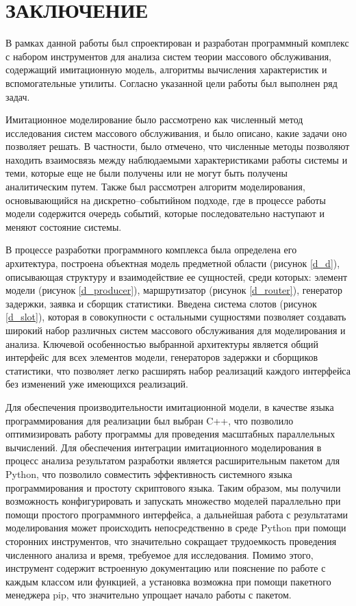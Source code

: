 \section*{\centering\normalsize ЗАКЛЮЧЕНИЕ}

В рамках данной работы был спроектирован и разработан программный комплекс с набором инструментов для анализа систем теории массового обслуживания, содержащий имитационную модель, алгоритмы вычисления характеристик и вспомогательные утилиты. Согласно указанной цели работы был выполнен ряд задач.

Имитационное моделирование было рассмотрено как численный метод исследования систем массового обслуживания, и было описано, какие задачи оно позволяет решать. В частности, было отмечено, что численные методы позволяют находить взаимосвязь между наблюдаемыми характеристиками работы системы и теми, которые еще не были получены или не могут быть получены аналитическим путем. Также был рассмотрен алгоритм моделирования, основывающийся на дискретно--событийном подходе, где в процессе работы модели содержится очередь событий, которые последовательно наступают и меняют состояние системы. 

В процессе разработки программного комплекса была определена его архитектура, построена объектная модель предметной области (рисунок  \ref{d_d}), описывающая структуру и взаимодействие ее сущностей, среди которых: элемент модели (рисунок \ref{d_producer}), маршрутизатор (рисунок \ref{d_router}), генератор задержки, заявка и сборщик статистики. Введена система слотов (рисунок \ref{d_slot}), которая в совокупности с остальными сущностями позволяет создавать широкий набор различных систем массового обслуживания для моделирования и анализа. Ключевой особенностью выбранной архитектуры является общий интерфейс для всех элементов модели, генераторов задержки и сборщиков статистики, что позволяет легко расширять набор реализаций каждого интерфейса без изменений уже имеющихся реализаций.

Для обеспечения производительности имитационной модели, в качестве языка программирования для реализации был выбран C++, что позволило оптимизировать работу программы для проведения масштабных параллельных вычислений. Для обеспечения интеграции имитационного моделирования в процесс анализа результатом разработки является расширительным пакетом для Python, что позволило совместить эффективность системного языка программирования и простоту скриптового языка. Таким образом, мы получили возможность конфигурировать и запускать множество моделей параллельно при помощи простого программного интерфейса, а дальнейшая работа с результатами моделирования может происходить непосредственно в среде Python при помощи сторонних инструментов, что значительно сокращает трудоемкость проведения численного анализа и время, требуемое для исследования. Помимо этого, инструмент содержит встроенную документацию или пояснение по работе с каждым классом или функцией, а установка возможна при помощи пакетного менеджера pip, что значительно упрощает начало работы с пакетом.

